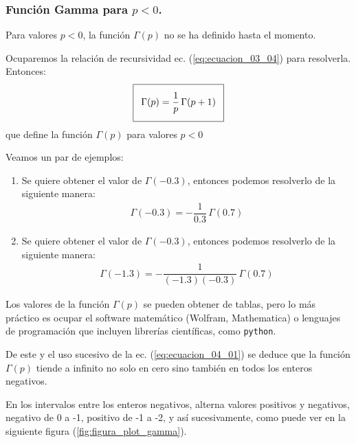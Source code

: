 \subsubsection{Función Gamma para \texorpdfstring{$p < 0$}{p < 0}.}

Para valores $p < 0$, la función $\Gamma (p)$ no se ha definido hasta el momento.
\par
Ocuparemos la relación de recursividad ec. (\ref{eq:ecuacion_03_04}) para resolverla. Entonces:
\begin{align}\addtolength{\fboxsep}{5pt}\boxed{
\Gamma (p) = \dfrac{1}{p} \, \Gamma (p + 1)}
\label{eq:ecuacion_04_01}
\end{align}
que define la función $\Gamma (p)$ para valores $p < 0$
\par
Veamos un par de ejemplos: 
\begin{enumerate}
\item  Se quiere obtener el valor de $\Gamma (-0.3)$, entonces podemos resolverlo de la siguiente manera:
\begin{align*}
\Gamma (-0.3) = - \dfrac{1}{0.3} \, \Gamma (0.7)
\end{align*}
\item  Se quiere obtener el valor de $\Gamma (-0.3)$, entonces podemos resolverlo de la siguiente manera:
\begin{align*}
\Gamma (-1.3) = - \dfrac{1}{(-1.3)(-0.3)} \, \Gamma (0.7)
\end{align*}
\end{enumerate}
Los valores de la función $\Gamma (p)$ se pueden obtener de tablas, pero lo más práctico es ocupar el software matemático (Wolfram, Mathematica) o lenguajes de programación que incluyen librerías científicas, como \texttt{python}.
\par
De este y el uso sucesivo de la ec. (\ref{eq:ecuacion_04_01}) se deduce que la función $\Gamma (p)$ tiende a infinito no solo en cero sino también en todos los enteros negativos.
\par
En los intervalos entre los enteros negativos, alterna valores positivos y negativos, negativo de 0 a -1, positivo de -1 a -2, y así sucesivamente, como puede ver en la siguiente figura (\ref{fig:figura_plot_gamma}).
